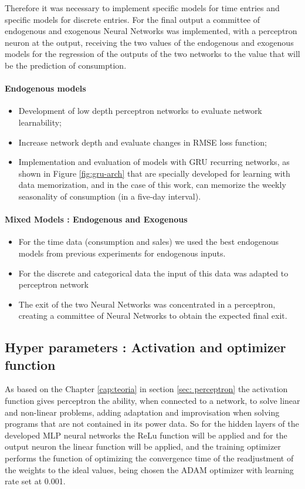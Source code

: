                 Therefore it was necessary to implement specific models for time entries and specific models for discrete entries.
                For the final output a committee of endogenous and exogenous Neural Networks was implemented, with a perceptron neuron at the output, receiving the two values of the endogenous and exogenous models for the regression of the outputs of the two networks to the value that will be the prediction of consumption.
         	\paragraph{Endogenous models}
         	\begin{itemize}
                \item	Development of low depth perceptron networks to evaluate network learnability;
                \item	Increase network depth and evaluate changes in RMSE loss function; 
                \item	Implementation and evaluation of models with GRU recurring networks, as shown in Figure \ref{fig:gru-arch} that are specially developed for learning with data memorization, and in the case of this work, can memorize the weekly seasonality of consumption (in a five-day interval).
            \end{itemize}
            \paragraph{Mixed Models : Endogenous and Exogenous}
                \begin{itemize}
                    \item For the time data (consumption and sales) we used the best endogenous models from previous experiments for endogenous inputs.
                    \item For the discrete and categorical data the input of this data was adapted to perceptron network
                    \item  The exit of the two Neural Networks was concentrated in a perceptron, creating a committee of Neural Networks to obtain the expected final exit.
                \end{itemize}
            
	\subsection{Hyper parameters : Activation and optimizer function}
        As based on the Chapter \ref{cap:teoria} in section \ref{sec: perceptron} the activation function gives perceptron the ability, when connected to a network, to solve linear and non-linear problems, adding adaptation and improvisation when solving programs that are not contained in its power data.
        So for the hidden layers of the developed MLP neural networks the ReLu function will be applied and for the output neuron the linear function will be applied, and the training optimizer performs the function of optimizing the convergence time of the readjustment of the weights to the ideal values, being chosen the ADAM optimizer with learning rate set at 0.001.

